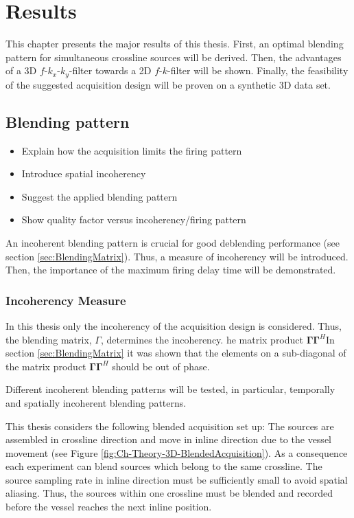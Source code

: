 \chapter{Results}

This chapter presents the major results of this thesis. First, an optimal blending pattern for simultaneous crossline sources will be derived. Then, the advantages of a 3D $f$-$k_x$-$k_y$-filter towards a 2D $f$-$k$-filter will be shown. Finally, the feasibility of the suggested acquisition design will be proven on a synthetic 3D data set. 

 
\section{Blending pattern}


\begin{itemize}
	\item Explain how the acquisition limits the firing pattern
	\item Introduce spatial incoherency
	\item Suggest the applied blending pattern
	\item Show quality factor versus incoherency/firing pattern
\end{itemize}

An incoherent blending pattern is crucial for good deblending performance (see section \ref{sec:BlendingMatrix}). Thus, a measure of incoherency will be introduced. Then, the importance of the maximum firing delay time will be demonstrated.

\subsection*{Incoherency Measure}

In this thesis only the incoherency of the acquisition design is considered. Thus, the blending matrix, $\Gamma$, determines the incoherency. he matrix product $\mathbf{\Gamma \Gamma}^H$In section \ref{sec:BlendingMatrix} it was shown that the elements on a sub-diagonal of the matrix product $\mathbf{\Gamma \Gamma}^H$ should be out of phase. 



Different incoherent blending patterns will be tested, in particular, temporally and spatially incoherent blending patterns. 

This thesis considers the following blended acquisition set up: The sources are assembled in crossline direction and move in inline direction due to the vessel movement (see Figure \ref{fig:Ch-Theory-3D-BlendedAcquisition}). As a consequence each experiment can blend sources which belong to the same crossline. The source sampling rate in inline direction must be sufficiently small to avoid spatial aliasing. Thus, the sources within one crossline must be blended and recorded before the vessel reaches the next inline position.

